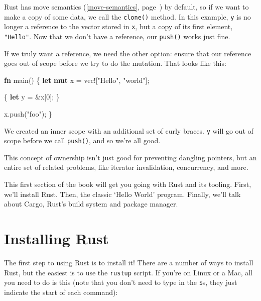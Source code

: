 \documentclass[a4paper,]{book}
\renewcommand*{\hyperref}[2][\ar]{%
  \def\ar{#2}%
  #2 (\autoref{#1}, page~\pageref{#1})}
\newenvironment{Shaded}{\begin{snugshade}}{\end{snugshade}}
\newcommand{\KeywordTok}[1]{\textcolor[rgb]{0.13,0.29,0.53}{\textbf{{#1}}}}
\newcommand{\DecValTok}[1]{\textcolor[rgb]{0.00,0.00,0.81}{{#1}}}
\newcommand{\StringTok}[1]{\textcolor[rgb]{0.31,0.60,0.02}{{#1}}}
\newcommand{\OtherTok}[1]{\textcolor[rgb]{0.56,0.35,0.01}{{#1}}}
\newcommand{\NormalTok}[1]{{#1}}
\begin{document}
Rust has \hyperref[move-semantics]{move semantics} by default, so if we
want to make a copy of some data, we call the \texttt{clone()} method.
In this example, \texttt{y} is no longer a reference to the vector
stored in \texttt{x}, but a copy of its first element, \texttt{"Hello"}.
Now that we don't have a reference, our \texttt{push()} works just fine.

If we truly want a reference, we need the other option: ensure that our
reference goes out of scope before we try to do the mutation. That looks
like this:

\begin{Shaded}
\begin{Highlighting}[]
\KeywordTok{fn} \NormalTok{main() \{}
    \KeywordTok{let} \KeywordTok{mut} \NormalTok{x = }\OtherTok{vec!}\NormalTok{[}\StringTok{"Hello"}\NormalTok{, }\StringTok{"world"}\NormalTok{];}

    \NormalTok{\{}
        \KeywordTok{let} \NormalTok{y = &x[}\DecValTok{0}\NormalTok{];}
    \NormalTok{\}}

    \NormalTok{x.push(}\StringTok{"foo"}\NormalTok{);}
\NormalTok{\}}
\end{Highlighting}
\end{Shaded}

We created an inner scope with an additional set of curly braces.
\texttt{y} will go out of scope before we call \texttt{push()}, and so
we're all good.

This concept of ownership isn't just good for preventing dangling
pointers, but an entire set of related problems, like iterator
invalidation, concurrency, and more.


This first section of the book will get you going with Rust and its
tooling. First, we'll install Rust. Then, the classic `Hello World'
program. Finally, we'll talk about Cargo, Rust's build system and
package manager.

\section{Installing Rust}\label{sec--installing-rust}

The first step to using Rust is to install it! There are a number of
ways to install Rust, but the easiest is to use the \texttt{rustup}
script. If you're on Linux or a Mac, all you need to do is this (note
that you don't need to type in the \texttt{\$}s, they just indicate the
start of each command):
\end{document}
